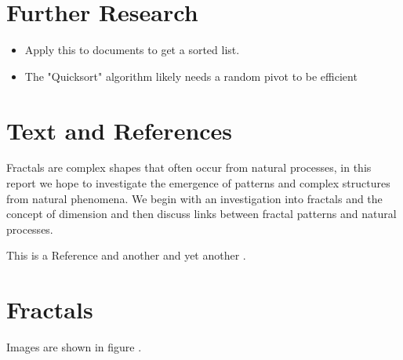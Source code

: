 \documentclass[a4paper,11pt,twoside]{article}
\begin{document}
\section{Further Research}
\label{sec:orgb3d98b1}

\begin{itemize}
\item Apply this to documents to get a sorted list.
\item The "Quicksort" algorithm likely needs a random pivot to be efficient \cite{timroughgardenQuicksortOverview2017}
\end{itemize}

\section{Text and References}
\label{sec:org84f033f}
Fractals are complex shapes that often occur from natural processes, in this
report we hope to investigate the emergence of patterns and complex structures
from natural phenomena. We begin with an investigation into fractals and the
concept of dimension and then discuss links between fractal patterns and natural
processes.

This is a Reference \cite{tuGraphBasedSemiSupervisedNearestNeighbor2016a} and another \cite{nicodemiIntroductionAbstractAlgebra2007a} and yet another \cite{christopherburgesRankNetLambdaRankLambdaMART2010}.

\section{Fractals}
\label{sec:orgef2a409}
Images are shown in figure .
\end{document}
